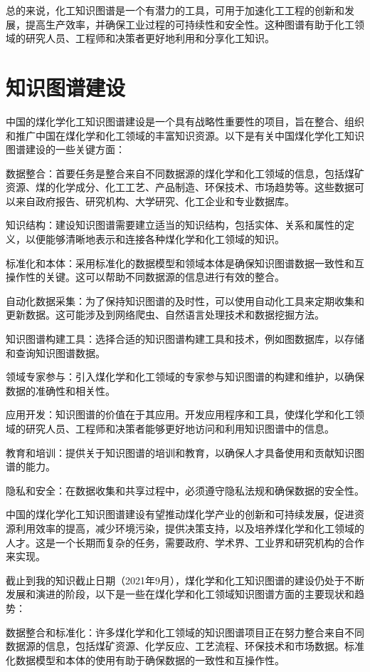 总的来说，化工知识图谱是一个有潜力的工具，可用于加速化工工程的创新和发展，提高生产效率，并确保工业过程的可持续性和安全性。这种图谱有助于化工领域的研究人员、工程师和决策者更好地利用和分享化工知识。

\section{知识图谱建设}

中国的煤化学化工知识图谱建设是一个具有战略性重要性的项目，旨在整合、组织和推广中国在煤化学和化工领域的丰富知识资源。以下是有关中国煤化学化工知识图谱建设的一些关键方面：

数据整合：首要任务是整合来自不同数据源的煤化学和化工领域的信息，包括煤矿资源、煤的化学成分、化工工艺、产品制造、环保技术、市场趋势等。这些数据可以来自政府报告、研究机构、大学研究、化工企业和专业数据库。

知识结构：建设知识图谱需要建立适当的知识结构，包括实体、关系和属性的定义，以便能够清晰地表示和连接各种煤化学和化工领域的知识。

标准化和本体：采用标准化的数据模型和领域本体是确保知识图谱数据一致性和互操作性的关键。这可以帮助不同数据源的信息进行有效的整合。

自动化数据采集：为了保持知识图谱的及时性，可以使用自动化工具来定期收集和更新数据。这可能涉及到网络爬虫、自然语言处理技术和数据挖掘方法。

知识图谱构建工具：选择合适的知识图谱构建工具和技术，例如图数据库，以存储和查询知识图谱数据。

领域专家参与：引入煤化学和化工领域的专家参与知识图谱的构建和维护，以确保数据的准确性和相关性。

应用开发：知识图谱的价值在于其应用。开发应用程序和工具，使煤化学和化工领域的研究人员、工程师和决策者能够更好地访问和利用知识图谱中的信息。

教育和培训：提供关于知识图谱的培训和教育，以确保人才具备使用和贡献知识图谱的能力。

隐私和安全：在数据收集和共享过程中，必须遵守隐私法规和确保数据的安全性。

中国的煤化学化工知识图谱建设有望推动煤化学产业的创新和可持续发展，促进资源利用效率的提高，减少环境污染，提供决策支持，以及培养煤化学和化工领域的人才。这是一个长期而复杂的任务，需要政府、学术界、工业界和研究机构的合作来实现。

截止到我的知识截止日期（2021年9月），煤化学和化工知识图谱的建设仍处于不断发展和演进的阶段，以下是一些在煤化学和化工领域知识图谱方面的主要现状和趋势：

数据整合和标准化：许多煤化学和化工领域的知识图谱项目正在努力整合来自不同数据源的信息，包括煤矿资源、化学反应、工艺流程、环保技术和市场数据。标准化数据模型和本体的使用有助于确保数据的一致性和互操作性。

